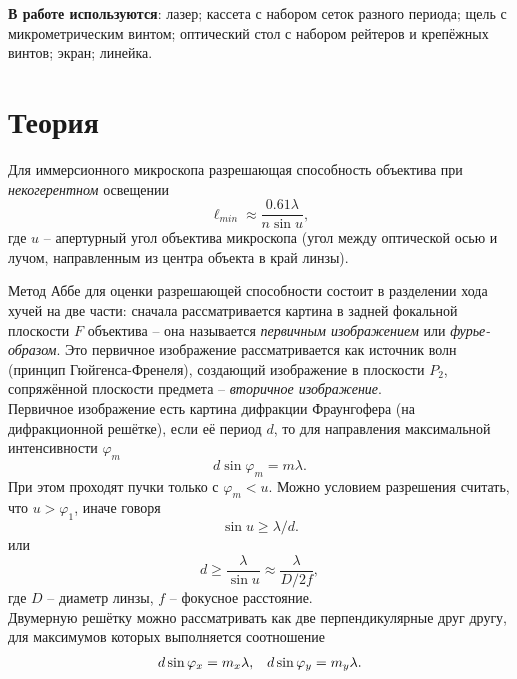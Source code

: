 \documentclass[a4paper,12pt]{article} %
\begin{document}
\textbf{В работе используются}: лазер; кассета с набором сеток разного периода; щель с микрометрическим винтом; оптический стол с набором рейтеров и крепёжных винтов; экран; линейка.
\section{Теория}
Для иммерсионного микроскопа разрешающая способность объектива при \textit{некогерентном} освещении
\begin{equation}
\ell_{min} \approx \dfrac{0.61\lambda}{n \sin u},
\end{equation}
где $u$ -- апертурный угол объектива микроскопа (угол между оптической осью и лучом, направленным из центра объекта в край линзы).

Метод Аббе для оценки разрешающей способности состоит в разделении хода хучей на две части: сначала рассматривается картина в задней фокальной плоскости $F$ объектива -- она называется \textit{первичным изображением} или \textit{фурье-образом}. Это первичное изображение рассматривается как источник волн (принцип Гюйгенса-Френеля), создающий изображение в плоскости $P_2$, сопряжённой плоскости предмета -- \textit{вторичное изображение}.\\
Первичное изображение есть картина дифракции Фраунгофера (на дифракционной решётке), если её период $d$, то для направления максимальной интенсивности $\varphi_m$
\begin{equation}
d \sin \varphi_m = m\lambda.
\end{equation}
При этом проходят пучки только с $\varphi_m < u$. Можно условием разрешения считать, что $u > \varphi_1$, иначе говоря
$$
\sin u \geq \lambda/d.
$$
или
\begin{equation}
d \geq \dfrac{\lambda}{\sin u} \approx \dfrac{\lambda}{D/2f},
\end{equation}
где $D$ -- диаметр линзы, $f$ -- фокусное расстояние.\\
Двумерную решётку можно рассматривать как две перпендикулярные друг другу, для максимумов которых выполняется соотношение
\begin{equation}
\begin{array}{c c}
d\sin \varphi_x = m_x \lambda, & d\sin \varphi_y = m_y \lambda. \\
\end{array}
\end{equation}
\newpage
\end{document}
